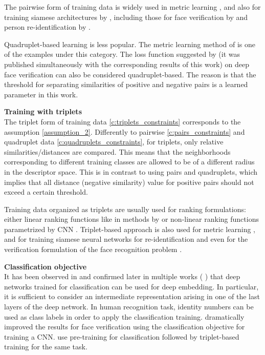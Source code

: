 The pairwise form of training data is widely used in metric learning \citep{xing2003distance,globerson2006metric,davis2007information,koestinger2012large,liao2015person,mignon2012pcca}, and also for training siamese architectures by \citep{Bromley93,hadsell2006dimensionality}, including those for face verification by \citep{Sun14, hu2014discriminative} and person re-identification by \citep{yi2014deep, Yi14}.

Quadruplet-based learning is less popular. The metric learning method of \citep{law2013quadruplet} is one of the examples under this category. 
The loss function suggested by \citep{Tadmor2016LearningAM} (it was published simultaneously with the corresponding results of this work) on deep face verification can also be considered quadruplet-based. The reason is that the threshold for separating similarities of positive and negative pairs is a learned parameter in this work. 


\bigskip\textbf{Training with triplets}\\
The triplet form of training data \ref{c:triplets_constraints} corresponds to the assumption \ref{assumption_2}. Differently to pairwise \ref{c:pairs_constraints} and quadruplet data \ref{c:quadruplets_constraints}, for triplets, only relative similarities/distances are compared. This means that the neighborhoods corresponding to different training classes are allowed to be of a different radius in the descriptor space. This is in contrast to using pairs and quadruplets, which implies that all distance (negative similarity) value for positive pairs should not exceed a  certain threshold. 

Training data organized as triplets are usually used for ranking formulations: either linear ranking functions like in methods by
\citep{joachims2002optimizing,prosser2010person,kuo2013person,paisitkriangkrai2015learning} or non-linear ranking functions parametrized by CNN \citep{chen2016deep}. Triplet-based approach is also used for metric learning \citep{schultz2004learning,weinberger2009distance}, and for training siamese neural networks for re-identification \citep{Song16} and even for the verification formulation of the face recognition problem \citep{SchroffKP15,parkhi2015deep}. 

\bigskip\textbf{Classification objective}\\
It has been observed in \citep{Krizhevsky12} and confirmed later in multiple works (\eg{} \citep{Razavian14}) that deep networks trained for classification can be used for deep embedding. In particular, it is sufficient to consider an intermediate representation arising in one of the last layers of the deep network. In human recognition task, identity numbers can be used as class labels in order to apply the classification training. \citep{Taigman14} dramatically improved the results for face verification using the classification objective for training a CNN. \citep{parkhi2015deep} use pre-training for classification followed by triplet-based training for the same task. 

